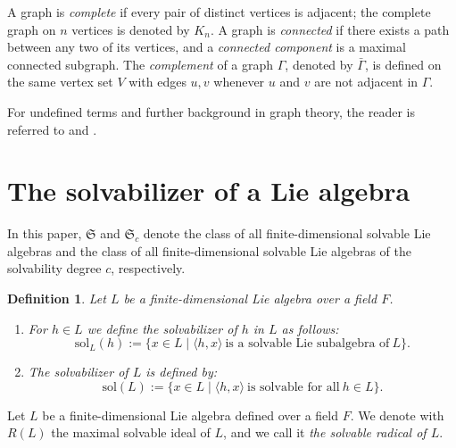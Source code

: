 \documentclass[11pt]{amsart}
\theoremstyle{plain}
\newtheorem{definition}{Definition}[section]
\def\sol{\mathrm{sol}}
\begin{document}
A graph is \emph{complete} if every pair of distinct vertices is adjacent; the complete graph on $n$ vertices is denoted by $K_n$. A graph is \emph{connected} if there exists a path between any two of its vertices, and a \emph{connected component} is a maximal connected subgraph. 
The \emph{complement} of a graph $\Gamma$, denoted by $\bar{\Gamma}$, is defined on the same vertex set $V$ with edges ${u,v}$ whenever $u$ and $v$ are not adjacent in $\Gamma$.

For undefined terms and further background in graph theory, the reader is referred to \cite{Diestel} and \cite{Nora}.







\section{The solvabilizer of a Lie algebra}
 
In this paper, $\mathfrak{S}$ and $\mathfrak{S}_c$ denote the class of all finite-dimensional solvable Lie algebras and the class of all finite-dimensional solvable Lie algebras of the solvability degree $c$, respectively.


\begin{definition}
Let $L$ be a finite-dimensional Lie algebra over a field $F$. 
\begin{enumerate}
    \item For $h\in L$ we define  the \emph{solvabilizer} of $h$ in $L$ as follows:
\begin{equation*}
\sol_L(h) := \{x\in L\mid  \langle h,x\rangle \ \text{is a solvable Lie subalgebra of} \  L \}.
\end{equation*}

\item The solvabilizer of $L$ is defined by:
\begin{equation*}
\sol(L) := \{x\in L\mid  \langle h,x\rangle \ \text{is solvable for all} \ h\in L\}.
\end{equation*}
\end{enumerate}
\end{definition}


Let $L$ be a finite-dimensional Lie algebra defined over a field $F$. We denote with $R(L)$ the maximal solvable ideal
of $L$, and we call it \emph{the solvable radical of $L$}. 
\end{document}
